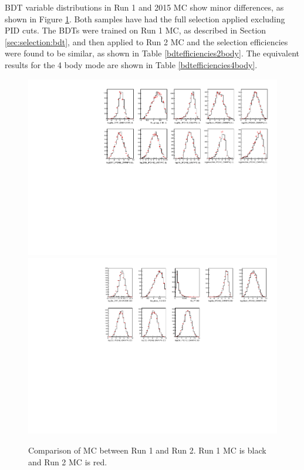 BDT variable distributions in Run 1 and 2015 MC show minor differences, as shown in Figure \ref{mcrun1vsrun2}. Both samples have had the full selection applied excluding PID cuts. The BDTs were trained on Run 1 MC, as described in Section \ref{sec:selection:bdt}, and then applied to Run 2 MC and the selection efficiencies were found to be similar, as shown in Table \ref{bdtefficiencies2body}. The equivalent results for the 4 body mode are shown in Table \ref{bdtefficiencies4body}.

\begin{figure}
\includegraphics[width=\linewidth]{figures/compareMC/compareMC_run1vsrun2_BDTvariablesLL.pdf}
\includegraphics[width=\linewidth]{figures/compareMC/compareMC_run1vsrun2_BDTvariablesDD.pdf}
\caption{Comparison of MC between Run 1 and Run 2. Run 1 MC is black and Run 2 MC is red.}
\label{mcrun1vsrun2}
\end{figure}


